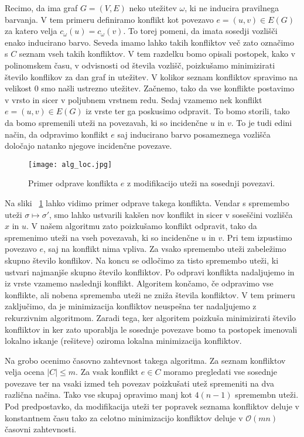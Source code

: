 \documentclass[12pt,a4paper,twoside]{article}
\theoremstyle{definition} %
\theoremstyle{plain} %
\numberwithin{equation}{section}  %
\begin{document}
Recimo, da ima graf $G = (V, E)$ neko utežitev $\omega$, ki ne inducira pravilnega barvanja. V tem primeru definiramo konflikt kot povezavo $e =(u, v) \in E(G)$ za katero velja $c_{\omega}(u) = c_{\omega}(v)$. To torej pomeni, da imata sosedji vozlišči enako inducirano barvo. Seveda imamo lahko takih konfliktov več zato označimo s $C$ seznam vseh takih konfliktov. V tem razdelku bomo opisali postopek, kako v polinomskem času, v odvisnosti od števila vozlišč, poizkušamo minimizirati število konflikov za dan graf in utežitev. V kolikor seznam konfliktov spravimo na velikost $0$ smo našli ustrezno utežitev. Začnemo, tako da vse konflikte postavimo v vrsto in sicer v poljubnem vrstnem redu. Sedaj vzamemo nek konflikt $e = (u, v) \in E(G)$ iz vrste ter ga poskusimo odpravit. To bomo storili, tako da bomo spremenili uteži na povezavah, ki so incidenčne $u$ in $v$. To je tudi edini način, da odpravimo konflikt $e$ saj inducirano barvo posameznega vozlišča določajo natanko njegove incidenčne povezave.
 \begin{figure}[h!]
\caption{Primer odprave konflikta $e$ z modifikacijo uteži na sosednji povezavi.}
\label{alg_loc}
\centering
    \texttt{[image: alg\_loc.jpg]}
    \end{figure}
Na sliki ~\ref{alg_loc} lahko vidimo primer odprave takega konflikta. Vendar s spremembo uteži $\sigma \mapsto\sigma'$, smo lahko ustvarili kakšen nov konflikt in sicer v soseščini vozlišča $x$ in $u$. V našem algoritmu zato poizkušamo konflikt odpravit, tako da spremenimo uteži na vseh povezavah, ki so incidenčne $u$ in $v$. Pri tem izpustimo povezavo $e$, saj na konflikt nima vpliva. Za vsako spremembo uteži zabeležimo skupno število konflikov. Na koncu se odločimo za tisto spremembo uteži, ki ustvari najmanjše skupno število konfliktov. Po odpravi konflikta nadaljujemo in iz vrste vzamemo naslednji konflikt. Algoritem končamo, če odpravimo vse konflikte, ali nobena sprememba uteži ne zniža števila konfliktov. V tem primeru zaključimo, da je minimizacija konfliktov neuspešna ter nadaljujemo z rekurzivnim algoritmom. Zaradi tega, ker algoritem poizkuša minimizirati število konfliktov in ker zato uporablja le sosednje povezave bomo ta postopek imenovali lokalno iskanje (rešiteve) oziroma lokalna minimizacija konfliktov.

Na grobo ocenimo časovno zahtevnost takega algoritma. Za seznam konfliktov velja ocena $|C| \le m$. Za vsak konflikt $e \in C$ moramo pregledati vse sosednje povezave ter na vsaki izmed teh povezav poizkušati utež spremeniti na dva različna načina. Tako vse skupaj opravimo manj kot $4(n-1)$ spremembn uteži. Pod predpostavko, da modifikacija uteži ter popravek seznama konfliktov deluje v konstantnem času tako za celotno minimizacijo konfliktov deluje v $\mathcal{O}(mn)$ časovni zahtevnosti.
\end{document}
